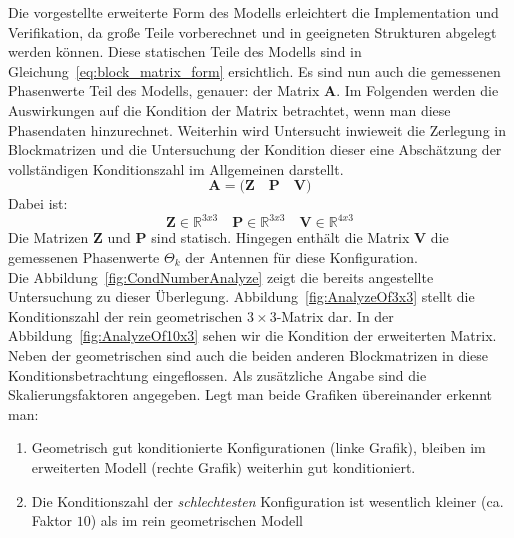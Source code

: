 Die vorgestellte erweiterte Form des Modells erleichtert die Implementation und Verifikation, da große Teile vorberechnet und in geeigneten Strukturen abgelegt werden können. Diese statischen Teile des Modells sind in Gleichung~\ref{eq:block_matrix_form} ersichtlich. Es sind nun auch die gemessenen Phasenwerte Teil des Modells, genauer: der Matrix $\mathbf{A}$. Im Folgenden werden die Auswirkungen auf die Kondition der Matrix betrachtet, wenn man diese Phasendaten hinzurechnet. Weiterhin wird Untersucht inwieweit die Zerlegung in Blockmatrizen und die Untersuchung der Kondition dieser eine Abschätzung der vollständigen Konditionszahl im Allgemeinen darstellt. 
%
\begin{equation}
\label{eq:block_matrix_form}
\mathbf{A}=\bigg( \mathbf{Z}\quad \mathbf{P}\quad \mathbf{V}\bigg)
\end{equation}
%
Dabei ist:
\begin{equation}
\mathbf{Z} \in \mathbb{R}^{3x3} \quad \mathbf{P} \in \mathbb{R}^{3x3} \quad \mathbf{V}\in \mathbb{R}^{4x3}
\end{equation}
%
Die Matrizen $\mathbf{Z}$ und $\mathbf{P}$ sind statisch. Hingegen enthält die Matrix $\mathbf{V}$ die gemessenen Phasenwerte $\Theta_k$ der Antennen für diese Konfiguration. \\
%
Die Abbildung~\ref{fig:CondNumberAnalyze} zeigt die bereits angestellte Untersuchung zu dieser Überlegung. Abbildung~\ref{fig:AnalyzeOf3x3} stellt die Konditionszahl der rein geometrischen $3\times3$-Matrix dar. In der Abbildung~\ref{fig:AnalyzeOf10x3} sehen wir die Kondition der erweiterten Matrix. Neben der geometrischen sind auch die beiden anderen Blockmatrizen in diese Konditionsbetrachtung eingeflossen. Als zusätzliche Angabe sind die Skalierungsfaktoren angegeben. Legt man beide Grafiken übereinander erkennt man:
\begin{enumerate}
\item Geometrisch gut konditionierte Konfigurationen (linke Grafik), bleiben im erweiterten Modell (rechte Grafik) weiterhin gut konditioniert.
\item Die Konditionszahl der \textit{schlechtesten} Konfiguration ist wesentlich kleiner (ca. Faktor $10$) als im rein geometrischen Modell %
\end{enumerate}
%
